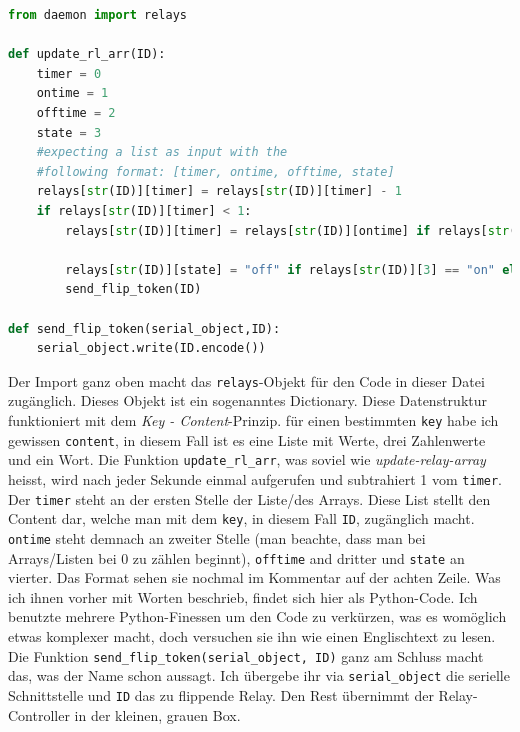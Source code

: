 \documentclass[12pt,titlepage,a4paper]{article}
\begin{document}
\begin{lstlisting}[language=Python]
from daemon import relays

def update_rl_arr(ID):
	timer = 0
	ontime = 1
	offtime = 2
	state = 3
	#expecting a list as input with the 
	#following format: [timer, ontime, offtime, state]
	relays[str(ID)][timer] = relays[str(ID)][timer] - 1	
	if relays[str(ID)][timer] < 1:
		relays[str(ID)][timer] = relays[str(ID)][ontime] if relays[str(ID)][state] == "off" else relay[str(ID)][offtime] 
																			# set timer to ontime if the old state was "off"
		relays[str(ID)][state] = "off" if relays[str(ID)][3] == "on" else "on" 				#set state to off if it was on, else on
		send_flip_token(ID)

def send_flip_token(serial_object,ID):
	serial_object.write(ID.encode())
\end{lstlisting}
Der Import ganz oben macht das \verb^relays^-Objekt für den Code in dieser Datei zugänglich. Dieses Objekt ist ein sogenanntes Dictionary. Diese Datenstruktur funktioniert mit dem \textit{Key - Content}-Prinzip. für einen bestimmten  \verb^key^ habe ich gewissen \verb^content^, in diesem Fall ist es eine Liste mit Werte, drei Zahlenwerte und ein Wort. Die Funktion  \verb^update_rl_arr^, was soviel wie \textit{update-relay-array} heisst, wird nach jeder Sekunde einmal aufgerufen und subtrahiert 1 vom  \verb^timer^. Der \verb^timer^ steht an der ersten Stelle der Liste/des Arrays. Diese List stellt den Content dar, welche man mit dem  \verb^key^, in diesem Fall  \verb^ID^, zugänglich macht.  \verb^ontime^ steht demnach an zweiter Stelle (man beachte, dass man bei Arrays/Listen bei 0 zu zählen beginnt),  \verb^offtime^ and dritter und  \verb^state^ an vierter. Das Format sehen sie nochmal im Kommentar auf der achten Zeile. Was ich ihnen vorher mit Worten beschrieb, findet sich hier als Python-Code. Ich benutzte mehrere Python-Finessen um den Code zu verkürzen, was es womöglich etwas komplexer macht, doch versuchen sie ihn wie einen Englischtext zu lesen. Die Funktion  \verb^send_flip_token(serial_object, ID)^ ganz am Schluss macht das, was der Name schon aussagt. Ich übergebe ihr via \verb^serial_object^ die serielle Schnittstelle und  \verb^ID^ das zu flippende Relay. Den Rest übernimmt der Relay-Controller in der kleinen, grauen Box.
\end{document}

